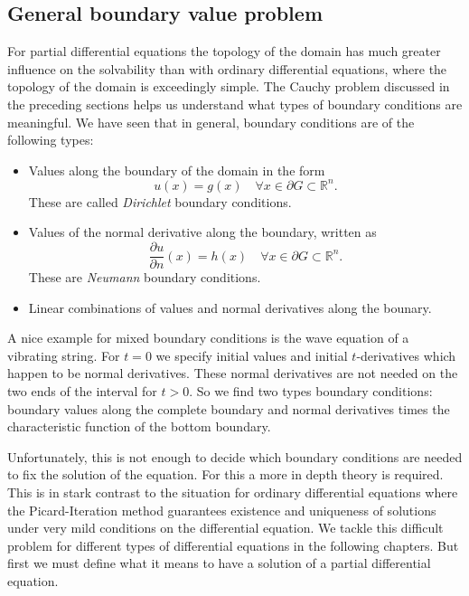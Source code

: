 \subsection{General boundary value problem
\label{klassifikation:allgemeines-randwertproblem}}
For partial differential equations the topology of the domain has much
greater influence on the solvability than with ordinary differential
equations, where the topology of the domain is exceedingly simple.
The Cauchy problem discussed in the preceding sections helps us understand
what types of boundary conditions are meaningful.
We have seen that in general, boundary conditions are of the following types:
\begin{itemize}
\item
Values along the boundary of the domain in the form
\[
u(x)=g(x)\quad \forall x\in\partial G\subset \mathbb R^n.
\]
These are called {\em Dirichlet} boundary conditions.
\item
Values of the normal derivative along the boundary, written as
\[
\frac{\partial u}{\partial n}(x)=h(x)\quad\forall x\in\partial G\subset \mathbb R^n.
\]
These are {\em Neumann} boundary conditions.
\item
Linear combinations of values and normal derivatives along the 
bounary.
\end{itemize}
A nice example for mixed boundary conditions is the wave equation of
a vibrating string.
For $t=0$ we specify initial values and initial $t$-derivatives which happen
to be normal derivatives.
These normal derivatives are not needed on the two ends of the interval
for $t>0$.
So we find two types boundary conditions: boundary values along the complete
boundary and normal derivatives times the characteristic function of
the bottom boundary.

Unfortunately, this is not enough to decide which boundary conditions are needed
to fix the solution of the equation.
For this a more in depth theory is required.
This is in stark contrast to the situation for ordinary differential
equations where the Picard-Iteration method guarantees existence and
uniqueness of solutions under very mild conditions on the differential
equation.
We tackle this difficult problem for different types of differential
equations in the following chapters.
But first we must define what it means to have a solution of a partial
differential equation.
